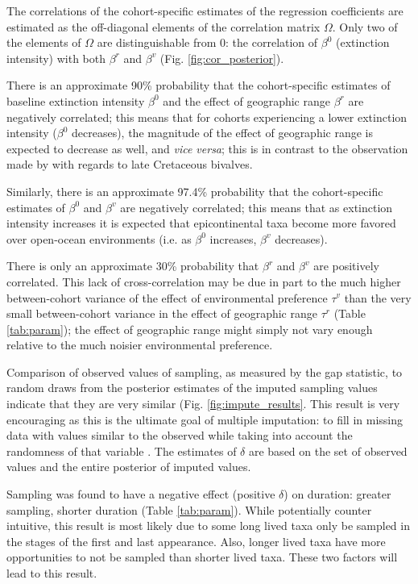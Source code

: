 \documentclass{article}
\begin{document}
The correlations of the cohort-specific estimates of the regression coefficients are estimated as the off-diagonal elements of the correlation matrix \(\Omega\). Only two of the elements of \(\Omega\) are distinguishable from 0: the correlation of \(\beta^{0}\) (extinction intensity) with both \(\beta^{r}\) and \(\beta^{v}\) (Fig. \ref{fig:cor_posterior}). 

There is an approximate 90\% probability that the cohort-specific estimates of baseline extinction intensity \(\beta^{0}\) and the effect of geographic range \(\beta^{r}\) are negatively correlated; this means that for cohorts experiencing a lower extinction intensity (\(\beta^{0}\) decreases), the magnitude of the effect of geographic range is expected to decrease as well, and \textit{vice versa}; this is in contrast to the observation made by \citet{Jablonski1986} with regards to late Cretaceous bivalves.

Similarly, there is an approximate 97.4\% probability that the cohort-specific estimates of \(\beta^{0}\) and \(\beta^{v}\) are negatively correlated; this means that as extinction intensity increases it is expected that epicontinental taxa become more favored over open-ocean environments (i.e. as \(\beta^{0}\) increases, \(\beta^{v}\) decreases). 

There is only an approximate 30\% probability that \(\beta^{r}\) and \(\beta^{v}\) are positively correlated. This lack of cross-correlation may be due in part to the much higher between-cohort variance of the effect of environmental preference \(\tau^{v}\) than the very small between-cohort variance in the effect of geographic range \(\tau^{r}\) (Table \ref{tab:param}); the effect of geographic range might simply not vary enough relative to the much noisier environmental preference.

Comparison of observed values of sampling, as measured by the gap statistic, to random draws from the posterior estimates of the imputed sampling values indicate that they are very similar (Fig. \ref{fig:impute_results}. This result is very encouraging as this is the ultimate goal of multiple imputation: to fill in missing data with values similar to the observed while taking into account the randomness of that variable \citep{Rubin1996,Gelman2007}. The estimates of \(\delta\) are based on the set of observed values and the entire posterior of imputed values.

Sampling was found to have a negative effect (positive \(\delta\)) on duration: greater sampling, shorter duration (Table \ref{tab:param}). While potentially counter intuitive, this result is most likely due to some long lived taxa only be sampled in the stages of the first and last appearance. Also, longer lived taxa have more opportunities to not be sampled than shorter lived taxa. These two factors will lead to this result. 
\end{document}
